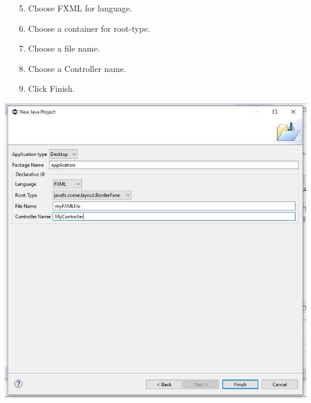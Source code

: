 \documentclass{beamer}
\begin{document}
\begin{frame}
    \begin{enumerate}
        \item[5.]  Choose FXML for language.       
        \item[6.]  Choose a container for root-type.
        \item[7.]  Choose a file name.
        \item[8.]  Choose a Controller name.
        \item[9.]  Click Finish.
    \end{enumerate}  
    
        \begin{center}
            \includegraphics[scale=.3]{settings.jpg}
        \end{center}      
\end{frame}
\end{document}
